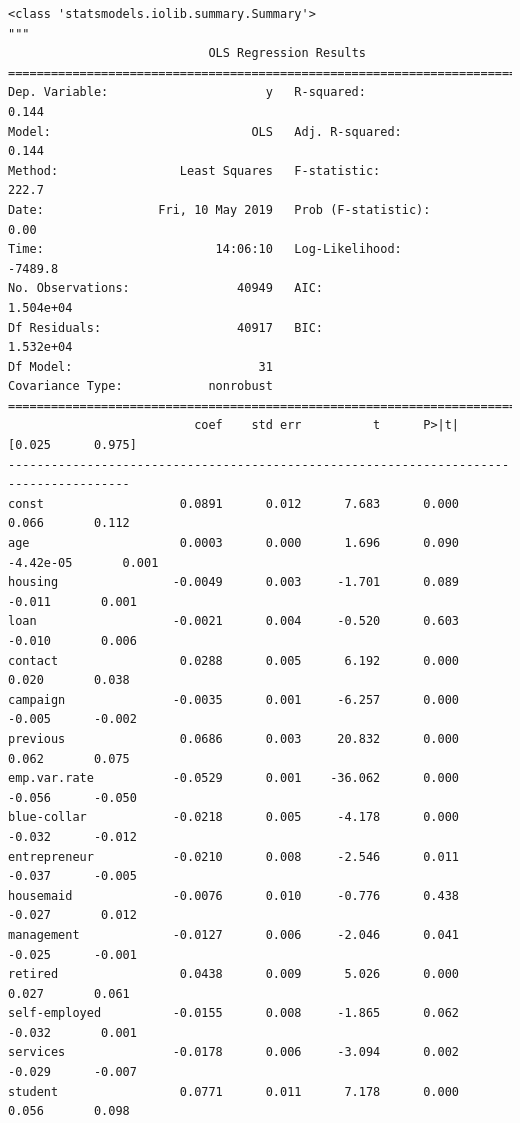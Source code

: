 \documentclass[8pt,onecolumn,aps,pra]{revtex4-1}
\begin{document}
    
    \begin{verbatim}
<class 'statsmodels.iolib.summary.Summary'>
"""
                            OLS Regression Results                            
==============================================================================
Dep. Variable:                      y   R-squared:                       0.144
Model:                            OLS   Adj. R-squared:                  0.144
Method:                 Least Squares   F-statistic:                     222.7
Date:                Fri, 10 May 2019   Prob (F-statistic):               0.00
Time:                        14:06:10   Log-Likelihood:                -7489.8
No. Observations:               40949   AIC:                         1.504e+04
Df Residuals:                   40917   BIC:                         1.532e+04
Df Model:                          31                                         
Covariance Type:            nonrobust                                         
=======================================================================================
                          coef    std err          t      P>|t|      [0.025      0.975]
---------------------------------------------------------------------------------------
const                   0.0891      0.012      7.683      0.000       0.066       0.112
age                     0.0003      0.000      1.696      0.090   -4.42e-05       0.001
housing                -0.0049      0.003     -1.701      0.089      -0.011       0.001
loan                   -0.0021      0.004     -0.520      0.603      -0.010       0.006
contact                 0.0288      0.005      6.192      0.000       0.020       0.038
campaign               -0.0035      0.001     -6.257      0.000      -0.005      -0.002
previous                0.0686      0.003     20.832      0.000       0.062       0.075
emp.var.rate           -0.0529      0.001    -36.062      0.000      -0.056      -0.050
blue-collar            -0.0218      0.005     -4.178      0.000      -0.032      -0.012
entrepreneur           -0.0210      0.008     -2.546      0.011      -0.037      -0.005
housemaid              -0.0076      0.010     -0.776      0.438      -0.027       0.012
management             -0.0127      0.006     -2.046      0.041      -0.025      -0.001
retired                 0.0438      0.009      5.026      0.000       0.027       0.061
self-employed          -0.0155      0.008     -1.865      0.062      -0.032       0.001
services               -0.0178      0.006     -3.094      0.002      -0.029      -0.007
student                 0.0771      0.011      7.178      0.000       0.056       0.098

\end{verbatim}
\end{document}
